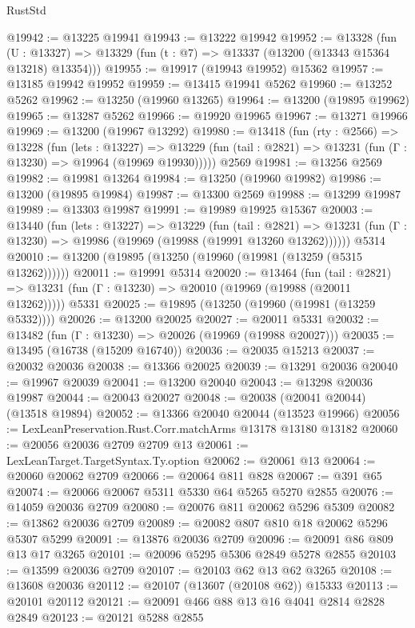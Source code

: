 \begin{lexlean}{RustStd}
\begin{coremodule}
@19942 := @13225 @19941
@19943 := @13222 @19942
@19952 := @13328
    (fun (U : @13327) => @13329 (fun (t : @7) => @13337 (@13200 (@13343 @15364 @13218) @13354)))
@19955 := @19917 (@19943 @19952) @15362
@19957 := @13185 @19942 @19952
@19959 := @13415 @19941 @5262
@19960 := @13252 @5262
@19962 := @13250 (@19960 @13265)
@19964 := @13200 (@19895 @19962)
@19965 := @13287 @5262
@19966 := @19920 @19965
@19967 := @13271 @19966
@19969 := @13200 (@19967 @13292)
@19980 := @13418
    (fun (rty : @2566) =>
    @13228
      (fun (lets : @13227) =>
      @13229 (fun (tail : @2821) => @13231 (fun (Γ : @13230) => @19964 (@19969 @19930)))))
    @2569
@19981 := @13256 @2569
@19982 := @19981 @13264
@19984 := @13250 (@19960 @19982)
@19986 := @13200 (@19895 @19984)
@19987 := @13300 @2569
@19988 := @13299 @19987
@19989 := @13303 @19987
@19991 := @19989 @19925 @15367
@20003 := @13440
    (fun (lets : @13227) =>
    @13229
      (fun (tail : @2821) =>
      @13231 (fun (Γ : @13230) => @19986 (@19969 (@19988 (@19991 @13260 @13262))))))
    @5314
@20010 := @13200 (@19895 (@13250 (@19960 (@19981 (@13259 (@5315 @13262))))))
@20011 := @19991 @5314
@20020 := @13464
    (fun (tail : @2821) => @13231 (fun (Γ : @13230) => @20010 (@19969 (@19988 (@20011 @13262)))))
    @5331
@20025 := @19895 (@13250 (@19960 (@19981 (@13259 @5332))))
@20026 := @13200 @20025
@20027 := @20011 @5331
@20032 := @13482 (fun (Γ : @13230) => @20026 (@19969 (@19988 @20027)))
@20035 := @13495 (@16738 (@15209 @16740))
@20036 := @20035 @15213
@20037 := @20032 @20036
@20038 := @13366 @20025
@20039 := @13291 @20036
@20040 := @19967 @20039
@20041 := @13200 @20040
@20043 := @13298 @20036 @19987
@20044 := @20043 @20027
@20048 := @20038 (@20041 @20044) (@13518 @19894)
@20052 := @13366 @20040 @20044 (@13523 @19966)
@20056 := LexLeanPreservation.Rust.Corr.matchArms @13178 @13180 @13182
@20060 := @20056 @20036 @2709 @2709 @13
@20061 := LexLeanTarget.TargetSyntax.Ty.option
@20062 := @20061 @13
@20064 := @20060 @20062 @2709
@20066 := @20064 @811 @828
@20067 := @391 @65
@20074 := @20066 @20067 @5311 @5330 @64 @5265 @5270 @2855
@20076 := @14059 @20036 @2709
@20080 := @20076 @811 @20062 @5296 @5309
@20082 := @13862 @20036 @2709
@20089 := @20082 @807 @810 @18 @20062 @5296 @5307 @5299
@20091 := @13876 @20036 @2709
@20096 := @20091 @86 @809 @13 @17 @3265
@20101 := @20096 @5295 @5306 @2849 @5278 @2855
@20103 := @13599 @20036 @2709
@20107 := @20103 @62 @13 @62 @3265
@20108 := @13608 @20036
@20112 := @20107 (@13607 (@20108 @62)) @15333
@20113 := @20101 @20112
@20121 := @20091 @466 @88 @13 @16 @4041 @2814 @2828 @2849
@20123 := @20121 @5288 @2855

\end{coremodule}
\end{lexlean}
